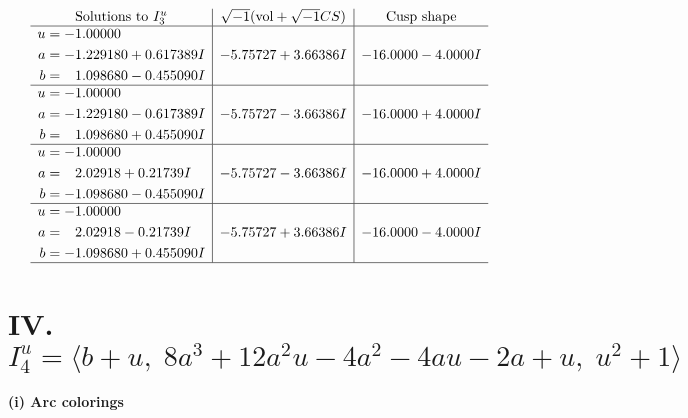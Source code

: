 \documentclass[1p]{elsarticle_modified}
\theoremstyle{definition}
\newcommand{\I}{\sqrt{-1}}
\begin{document}
$$\begin{array}{c|c|c}  
\text{Solutions to }I^u_{3}& \I (\text{vol} + \sqrt{-1}CS) & \text{Cusp shape}\\
 \hline 
\begin{aligned}
u &= -1.00000\phantom{ +0.000000I} \\
a &= -1.229180 + 0.617389 I \\
b &= \phantom{-}1.098680 - 0.455090 I\end{aligned}
 & -5.75727 + 3.66386 I & -16.0000 - 4.0000 I \\ \hline\begin{aligned}
u &= -1.00000\phantom{ +0.000000I} \\
a &= -1.229180 - 0.617389 I \\
b &= \phantom{-}1.098680 + 0.455090 I\end{aligned}
 & -5.75727 - 3.66386 I & -16.0000 + 4.0000 I \\ \hline\begin{aligned}
u &= -1.00000\phantom{ +0.000000I} \\
a &= \phantom{-}2.02918 + 0.21739 I \\
b &= -1.098680 - 0.455090 I\end{aligned}
 & -5.75727 - 3.66386 I & -16.0000 + 4.0000 I \\ \hline\begin{aligned}
u &= -1.00000\phantom{ +0.000000I} \\
a &= \phantom{-}2.02918 - 0.21739 I \\
b &= -1.098680 + 0.455090 I\end{aligned}
 & -5.75727 + 3.66386 I & -16.0000 - 4.0000 I\\
 \hline 
 \end{array}$$\newpage\newpage\renewcommand{\arraystretch}{1}
\centering \section*{IV. $I^u_{4}= \langle b+u,\;8 a^3+12 a^2 u-4 a^2-4 a u-2 a+u,\;u^2+1 \rangle$}
\flushleft \textbf{(i) Arc colorings}\\
\end{document}

